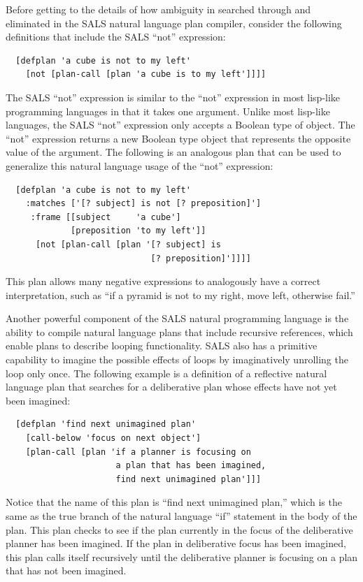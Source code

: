 Before getting to the details of how ambiguity in searched through and
eliminated in the SALS natural language plan compiler, consider the
following definitions that include the SALS ``not'' expression:
\begin{samepage}
\begin{Verbatim}
  [defplan 'a cube is not to my left'
    [not [plan-call [plan 'a cube is to my left']]]]
\end{Verbatim}
\end{samepage}
The SALS ``not'' expression is similar to the ``not'' expression in
most lisp-like programming languages in that it takes one argument.
Unlike most lisp-like languages, the SALS ``not'' expression only
accepts a Boolean type of object.  The ``not'' expression returns a
new Boolean type object that represents the opposite value of the
argument.  The following is an analogous plan that can be used to
generalize this natural language usage of the ``not'' expression:
\begin{samepage}
\begin{Verbatim}
  [defplan 'a cube is not to my left'
    :matches ['[? subject] is not [? preposition]']
     :frame [[subject     'a cube']
             [preposition 'to my left']]
      [not [plan-call [plan '[? subject] is
                             [? preposition]']]]]
\end{Verbatim}
\end{samepage}
This plan allows many negative expressions to analogously have a
correct interpretation, such as ``if a pyramid is not to my right,
move left, otherwise fail.''

Another powerful component of the SALS natural programming language is
the ability to compile natural language plans that include recursive
references, which enable plans to describe looping functionality.
SALS also has a primitive capability to imagine the possible effects
of loops by imaginatively unrolling the loop only once.  The following
example is a definition of a reflective natural language plan that
searches for a deliberative plan whose effects have not yet been
imagined:
\begin{samepage}
\begin{Verbatim}
  [defplan 'find next unimagined plan'
    [call-below 'focus on next object']
    [plan-call [plan 'if a planner is focusing on
                      a plan that has been imagined,
                      find next unimagined plan']]]
\end{Verbatim}
\end{samepage}
Notice that the name of this plan is ``find next unimagined plan,''
which is the same as the true branch of the natural language ``if''
statement in the body of the plan.  This plan checks to see if the
plan currently in the focus of the deliberative planner has been
imagined.  If the plan in deliberative focus has been imagined, this
plan calls itself recursively until the deliberative planner is
focusing on a plan that has not been imagined.

